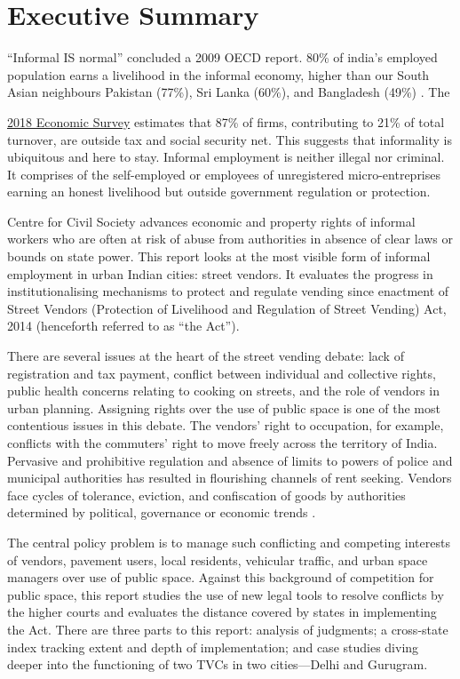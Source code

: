 \documentclass[a4paper, 12pt, twoside]{article}
\begin{document}
\newpage
\section*{Executive Summary}

“Informal IS normal” concluded a 2009 OECD report. 80\% of india’s employed population earns a livelihood in the informal economy, higher than our South Asian neighbours Pakistan (77\%), Sri Lanka (60\%), and Bangladesh (49\%) \parencite{iloreport}. The {\href{http://mofapp.nic.in:8080/economicsurvey/pdf/032-042_Chapter_02_ENGLISH_Vol_01_2017-18.pdf}{2018 Economic Survey} estimates that 87\% of firms, contributing to 21\% of total turnover, are outside tax and social security net. This suggests that informality is ubiquitous and here to stay. Informal employment is neither illegal nor criminal. It comprises of the self-employed or employees of unregistered micro-entreprises earning an honest livelihood but outside government regulation or protection.

Centre for Civil Society advances economic and property rights of informal workers who are often at risk of abuse from authorities in absence of clear laws or bounds on state power. This report looks at the most visible form of informal employment in urban Indian cities: street vendors. It evaluates the progress in institutionalising mechanisms to protect and regulate vending since enactment of Street Vendors (Protection of Livelihood and Regulation of Street Vending) Act, 2014 (henceforth referred to as “the Act”).

There are several issues at the heart of the street vending debate: lack of registration and tax payment, conflict between individual and collective rights, public health concerns relating to cooking on streets, and the role of vendors in urban planning. Assigning rights over the use of public space is one of the most contentious issues in this debate. The vendors’ right to occupation, for example, conflicts with the commuters’ right to move freely across the territory of India. Pervasive and prohibitive regulation and absence of limits to powers of police and municipal authorities has resulted in flourishing channels of rent seeking. Vendors face cycles of tolerance, eviction, and confiscation of goods by authorities determined by political, governance or economic trends \parencite{sallypaper}.

The central policy problem is to manage such conflicting and competing interests of vendors, pavement users, local residents, vehicular traffic, and urban space managers over use of public space. Against this background of competition for public space, this report studies the use of new legal tools to resolve conflicts by the higher courts and evaluates the distance covered by states in implementing the Act. There are three parts to this report: analysis of judgments; a cross-state index tracking extent and depth of implementation; and case studies diving deeper into the functioning of two TVCs in two cities—Delhi and Gurugram.

}
\end{document}
